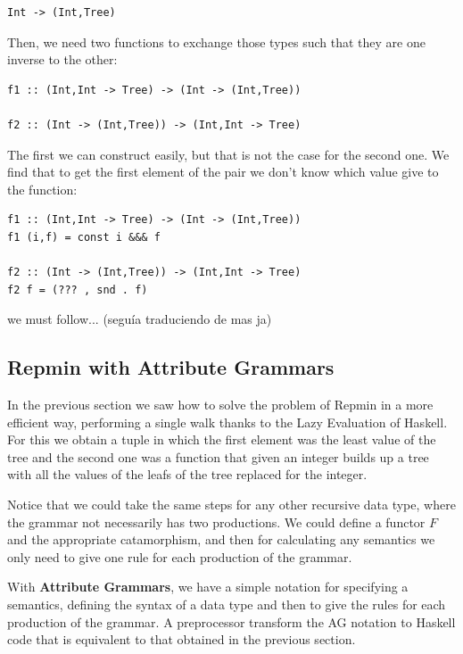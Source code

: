 \documentclass[a4paper,10pt]{article}
\begin{document}
\begin{lstlisting}
Int -> (Int,Tree)
\end{lstlisting} 

Then, we need two functions to exchange those types such that they are one inverse to the other:
  
\begin{lstlisting}
f1 :: (Int,Int -> Tree) -> (Int -> (Int,Tree))
  
f2 :: (Int -> (Int,Tree)) -> (Int,Int -> Tree)
\end{lstlisting}

The first we can construct easily, but that is not the case for the second one. We find that to
get the first element of the pair we don't know which value give to the function:

\begin{lstlisting}
f1 :: (Int,Int -> Tree) -> (Int -> (Int,Tree))
f1 (i,f) = const i &&& f

f2 :: (Int -> (Int,Tree)) -> (Int,Int -> Tree)
f2 f = (??? , snd . f)
\end{lstlisting}

we must follow... (seguía traduciendo de mas ja)


\subsection{Repmin with Attribute Grammars}

In the previous section we saw how to solve the problem of Repmin in a more efficient way, performing
a single walk thanks to the Lazy Evaluation of Haskell. For this we obtain a tuple in
which the first element was the least value of the tree and the second one was a function that
given an integer builds up a tree with all the values of the leafs of the tree replaced for
the integer.

Notice that we could take the same steps for any other recursive data type, where the grammar
not necessarily has two productions. We could define a functor $F$ and the appropriate catamorphism,
and then for calculating any semantics we only need to give one rule for each production of the
grammar.

With \textbf{Attribute Grammars}, we have a simple notation for specifying a semantics, defining the
syntax of a data type and then to give the rules for each production of the grammar. A preprocessor
transform the AG notation to Haskell code that is equivalent to that obtained in the previous
section.
\end{document}
